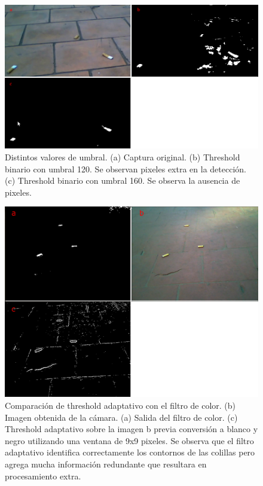 \begin{figure}[tpb]
\begin{center}
  \includegraphics[scale=0.4]{vision/figures/threshold-dif.png}
\end{center}
  \caption[Distintos valores de umbral]{\small Distintos valores de umbral. (a) Captura original. 
  (b) Threshold binario con umbral 120. Se observan pixeles extra en 
  la detecci\'on. (c) Threshold binario con umbral 160. Se observa la 
  ausencia de pixeles. }
  \label{fig:thresh-dif}
\end{figure}

\begin{figure}[tpb]
\begin{center}
  \includegraphics[scale=0.25]{vision/figures/adaptative.png}
\end{center}
  \caption[Comparación threshold con filtro de color]{\small Comparaci\'on de threshold adaptativo con el filtro de 
  color. (b) Imagen obtenida de la c\'amara. 
  (a) Salida del filtro de color. (c) Threshold adaptativo sobre la 
  imagen b previa conversi\'on a blanco y negro utilizando una ventana 
  de 9x9 pixeles. Se observa que el filtro adaptativo identifica 
  correctamente los contornos de las colillas pero agrega mucha 
  informaci\'on redundante que resultara en procesamiento extra.}
  \label{fig:thresh_adapt}
\end{figure}


